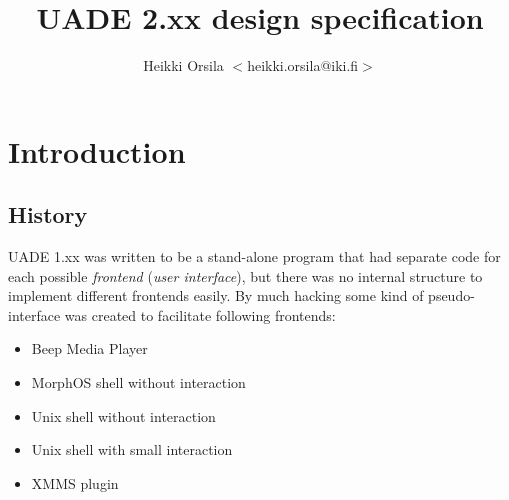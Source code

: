 \documentclass{article}
\begin{document}
\title{UADE 2.xx design specification}
\author{Heikki Orsila $<$heikki.orsila@iki.fi$>$}
\date{}
\maketitle

\section{Introduction}

\subsection{History}

UADE 1.xx was written to be a stand-alone program that had separate code
for each possible \emph{frontend} (\emph{user interface}), but there was
no internal structure to implement different frontends easily. By much
hacking some kind of pseudo-interface was created to facilitate following
frontends:
\begin{itemize}
  \item Beep Media Player
  \item MorphOS shell without interaction
  \item Unix shell without interaction
  \item Unix shell with small interaction
  \item XMMS plugin
\end{itemize}
\end{document}
